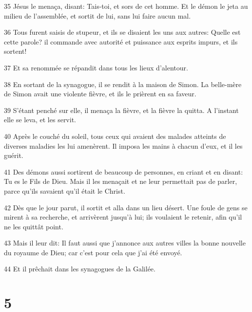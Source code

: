 \par 35 Jésus le menaça, disant: Tais-toi, et sors de cet homme. Et le démon le jeta au milieu de l'assemblée, et sortit de lui, sans lui faire aucun mal.
\par 36 Tous furent saisis de stupeur, et ils se disaient les uns aux autres: Quelle est cette parole? il commande avec autorité et puissance aux esprits impurs, et ils sortent!
\par 37 Et sa renommée se répandit dans tous les lieux d'alentour.
\par 38 En sortant de la synagogue, il se rendit à la maison de Simon. La belle-mère de Simon avait une violente fièvre, et ils le prièrent en sa faveur.
\par 39 S'étant penché sur elle, il menaça la fièvre, et la fièvre la quitta. A l'instant elle se leva, et les servit.
\par 40 Après le couché du soleil, tous ceux qui avaient des malades atteints de diverses maladies les lui amenèrent. Il imposa les mains à chacun d'eux, et il les guérit.
\par 41 Des démons aussi sortirent de beaucoup de personnes, en criant et en disant: Tu es le Fils de Dieu. Mais il les menaçait et ne leur permettait pas de parler, parce qu'ils savaient qu'il était le Christ.
\par 42 Dès que le jour parut, il sortit et alla dans un lieu désert. Une foule de gens se mirent à sa recherche, et arrivèrent jusqu'à lui; ils voulaient le retenir, afin qu'il ne les quittât point.
\par 43 Mais il leur dit: Il faut aussi que j'annonce aux autres villes la bonne nouvelle du royaume de Dieu; car c'est pour cela que j'ai été envoyé.
\par 44 Et il prêchait dans les synagogues de la Galilée.

\chapter{5}

